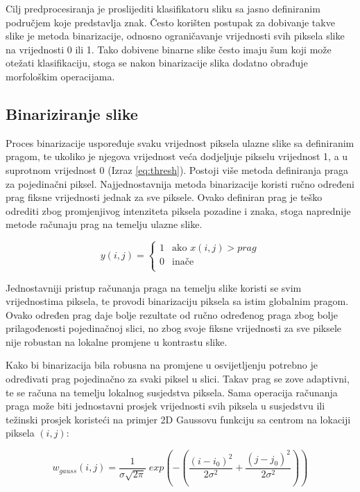 \documentclass[lmodern, utf8, diplomski, numeric]{fer}
\begin{document}
Cilj predprocesiranja je proslijediti klasifikatoru sliku sa jasno definiranim područjem koje predstavlja znak. Često korišten postupak za dobivanje takve slike je metoda binarizacije, odnosno ograničavanje vrijednosti svih piksela slike na vrijednosti 0 ili 1. Tako dobivene binarne slike često imaju šum koji može otežati klasifikaciju, stoga se nakon binarizacije slika dodatno obrađuje morfološkim operacijama.

\subsection{Binariziranje slike}

Proces binarizacije uspoređuje svaku vrijednost piksela ulazne slike sa definiranim pragom, te ukoliko je njegova vrijednost veća dodjeljuje pikselu vrijednost 1, a u suprotnom vrijednost 0 (Izraz \ref{eq:thresh}). Postoji više metoda definiranja praga za pojedinačni piksel. Najjednostavnija metoda binarizacije koristi ručno određeni prag fiksne vrijednosti jednak za sve piksele. Ovako definiran prag je teško odrediti zbog promjenjivog intenziteta piksela pozadine i znaka, stoga naprednije metode računaju prag na temelju ulazne slike. 

\begin{equation}
\label{eq:thresh}
y(i,j) = \begin{cases}
1 & \text{ako } x(i,j) > prag \\
0 & \text{inače}\\
\end{cases}
\end{equation}

Jednostavniji pristup računanja praga na temelju slike koristi se svim vrijednostima piksela, te provodi binarizaciju piksela sa istim globalnim pragom. Ovako određen prag daje bolje rezultate od ručno određenog praga zbog bolje prilagođenosti pojedinačnoj slici, no zbog svoje fiksne vrijednosti za sve piksele nije robustan na lokalne promjene u kontrastu slike. 

Kako bi binarizacija bila robusna na promjene u osvijetljenju potrebno je određivati prag pojedinačno za svaki piksel u slici. Takav prag se zove adaptivni, te se računa na temelju lokalnog susjedstva piksela. Sama operacija računanja praga može biti jednostavni prosjek vrijednosti svih piksela u susjedstvu ili težinski prosjek koristeći na primjer 2D Gaussovu funkciju sa centrom na lokaciji piksela $(i,j)$:

\begin{equation}
\label{eq:gs}
w_{gauss}(i, j) = \frac{1}{\sigma \sqrt{2\pi }} \; exp \left (- \left( \frac{ \left (i - i_0 \right )^2}{ 2\sigma^2} + \frac{(j - j_0)^2}{ 2\sigma^2} \right ) \right )
\end{equation}
\end{document}
